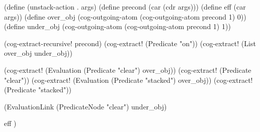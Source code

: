 \begin{python}
(define (unstack-action . args)
  (define precond (car (cdr args)))
  (define eff (car args))
  (define over_obj 
    (cog-outgoing-atom (cog-outgoing-atom precond 1) 0))
  (define under_obj 
    (cog-outgoing-atom (cog-outgoing-atom precond 1) 1))

  (cog-extract-recursive! precond)
  (cog-extract! (Predicate "on"))
  (cog-extract! (List over_obj under_obj))

  (cog-extract! (Evaluation (Predicate "clear") over_obj))
  (cog-extract! (Predicate "clear"))
  (cog-extract! (Evaluation (Predicate "stacked") over_obj))
  (cog-extract! (Predicate "stacked"))

  (EvaluationLink (PredicateNode "clear") under_obj)

  eff
)


\end{python}
